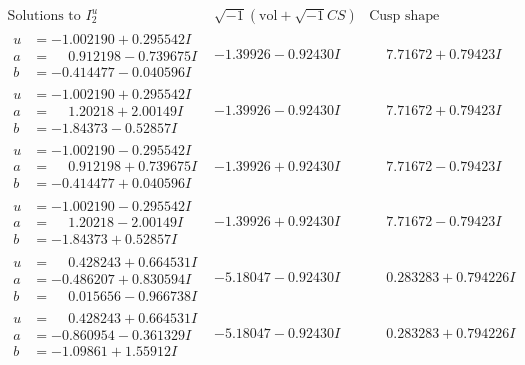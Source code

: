 \documentclass[1p]{elsarticle_modified}
\theoremstyle{definition}
\newcommand{\I}{\sqrt{-1}}
\begin{document}
$$\begin{array}{c|c|c}  
\text{Solutions to }I^u_{2}& \I (\text{vol} + \sqrt{-1}CS) & \text{Cusp shape}\\
 \hline 
\begin{aligned}
u &= -1.002190 + 0.295542 I \\
a &= \phantom{-}0.912198 - 0.739675 I \\
b &= -0.414477 - 0.040596 I\end{aligned}
 & -1.39926 - 0.92430 I & \phantom{-}7.71672 + 0.79423 I \\ \hline\begin{aligned}
u &= -1.002190 + 0.295542 I \\
a &= \phantom{-}1.20218 + 2.00149 I \\
b &= -1.84373 - 0.52857 I\end{aligned}
 & -1.39926 - 0.92430 I & \phantom{-}7.71672 + 0.79423 I \\ \hline\begin{aligned}
u &= -1.002190 - 0.295542 I \\
a &= \phantom{-}0.912198 + 0.739675 I \\
b &= -0.414477 + 0.040596 I\end{aligned}
 & -1.39926 + 0.92430 I & \phantom{-}7.71672 - 0.79423 I \\ \hline\begin{aligned}
u &= -1.002190 - 0.295542 I \\
a &= \phantom{-}1.20218 - 2.00149 I \\
b &= -1.84373 + 0.52857 I\end{aligned}
 & -1.39926 + 0.92430 I & \phantom{-}7.71672 - 0.79423 I \\ \hline\begin{aligned}
u &= \phantom{-}0.428243 + 0.664531 I \\
a &= -0.486207 + 0.830594 I \\
b &= \phantom{-}0.015656 - 0.966738 I\end{aligned}
 & -5.18047 - 0.92430 I & \phantom{-}0.283283 + 0.794226 I \\ \hline\begin{aligned}
u &= \phantom{-}0.428243 + 0.664531 I \\
a &= -0.860954 - 0.361329 I \\
b &= -1.09861 + 1.55912 I\end{aligned}
 & -5.18047 - 0.92430 I & \phantom{-}0.283283 + 0.794226 I \\ \hline\begin{aligned}

\end{aligned}
\end{array}$$
\end{document}
